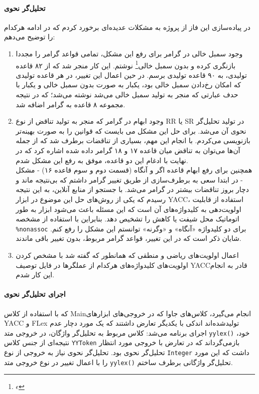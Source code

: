 \documentclass{article}
\theoremstyle{definition}
\begin{document}
	\paragraph{تحلیل‌گر نحوی}
	در پیاده‌سازی این فاز از پروژه به مشکلات عدیده‌ای برخورد کردم که در ادامه هرکدام را توضیح می‌دهم:
	\begin{enumerate}
		\item وجود سمبل خالی در گرامر
		برای رفع این مشکل، تمامی قواعد گرامر را مجددا بازنگری کرده و بدون سمبل خالی\footnote{$\epsilon$} نوشتم. این کار منجر شد که از ۸۲ قاعده تولیدی، به ۹۰ قاعده تولیدی برسم. در حین اعمال این تغییر، در هر قاعده تولیدی که امکان رخ‌دادن سمبل خالی بود، یکبار به صورت بدون سمبل خالی و یکبار با حدف عبارتی که منجر به تولید سمبل خالی می‌شد نوشته می‌شد؛ که در نتیجه مجموعه ۸ قاعده به گرامر اضافه شد.
		\item وجود ابهام در گرامر
		که منجر به تولید تناقض از نوع RR یا SR در تولید تحلیل‌گر نحوی آن می‌شد. برای حل این مشکل می بایست که قوانین را به صورت بهینه‌تر بازنویسی می‌کردم. با انجام این مهم، بسیاری از تناقضات برطرف شد که از جمله آن‌ها می‌توان به تناقض میان قاعده ۱۷ و ۱۸ گرامر داده شده اشاره کرد که در نهایت با ادغام این دو قاعده، موفق به رفع این مشکل شدم. \\
		همچنین برای رفع ابهام قاعده اگر و آنگاه (قسمت دوم و سوم قاعده ۱۶) - مشکل
		- در ابتدا سعی به برطرف‌سازی از طریق تغییر گرامر داشتم که بی‌نتیجه ماند و دچار بروز تناقضات بیشتر در گرامر می‌شد. با جستجو از منابع آنلاین، به این نتیجه رسیدم که یکی از روش‌های حل این موضوع در ابزار YACC، استفاده از قابلیت اولویت‌دهی به کلیدواژه‌های آن است که این مسئله باعث می‌شود ابزار به طور اتوماتیک محل شیفت یا کاهش را تشخیص دهد. بنابراین با استفاده از مشخصه
		\texttt{\%nonassoc}
		برای دو کلیدواژه «آنگاه» و «وگرنه» توانستم این مشکل را رفع کنم. شایان ذکر است که در این تغییر، قواعد گرامر مربوط، بدون تغییر باقی ماندند.
		\item اعمال اولویت‌های ریاضی و منطقی
		که همانطور که گفته شد با مشخص کردن اولویت‌های کلیدواژه‌های هرکدام از عملگر‌ها در فایل توصیف YACC‌قادر به انجام این کار شدم.
	\end{enumerate}

	\paragraph{اجرای تحلیل‌گر نحوی}
	که با استفاده از کلاس Main‌انجام می‌گیرد، کلاس‌های جاوا که در خروجی‌های ابزارهای YACC و FLex تولید‌شده‌اند اندکی با یکدیگر تعارض داشتند که یک مورد دچار عدم اجرای برنامه می‌شد: کلاس مربوط به تحلیل‌گر واژگان، در خروجی متد \texttt{yylex()} خود، نتیجه‌ای از جنس کلاس \texttt{YYToken} بازمی‌گرداند که در تعارض با خروجی مورد انتظار تحلیل‌گر نحوی بود. تحلیل‌گر نحوی نیاز به خروجی از نوع \texttt{Integer} داشت که این مورد را با اعمال تغییر در نوع خروجی متد \texttt{yylex()} تحلیل‌گر واژگانی برطرف ساختم.
\end{document}
